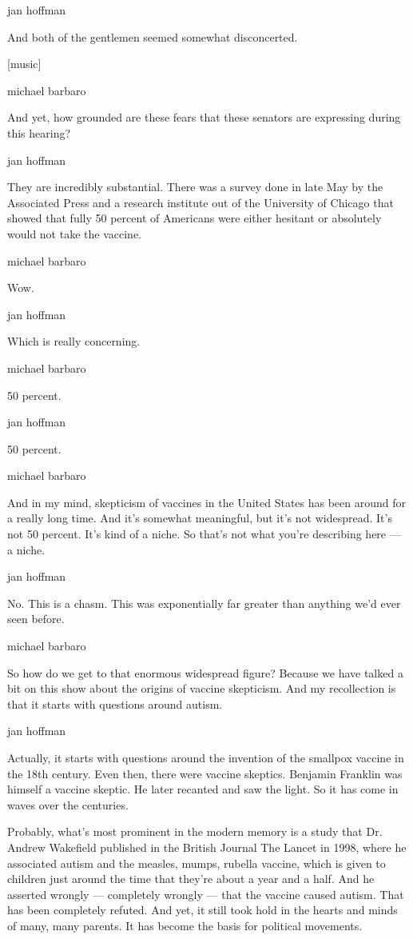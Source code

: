 jan hoffman

And both of the gentlemen seemed somewhat disconcerted.

{[}music{]}

michael barbaro

And yet, how grounded are these fears that these senators are expressing
during this hearing?

jan hoffman

They are incredibly substantial. There was a survey done in late May by
the Associated Press and a research institute out of the University of
Chicago that showed that fully 50 percent of Americans were either
hesitant or absolutely would not take the vaccine.

michael barbaro

Wow.

jan hoffman

Which is really concerning.

michael barbaro

50 percent.

jan hoffman

50 percent.

michael barbaro

And in my mind, skepticism of vaccines in the United States has been
around for a really long time. And it's somewhat meaningful, but it's
not widespread. It's not 50 percent. It's kind of a niche. So that's not
what you're describing here --- a niche.

jan hoffman

No. This is a chasm. This was exponentially far greater than anything
we'd ever seen before.

michael barbaro

So how do we get to that enormous widespread figure? Because we have
talked a bit on this show about the origins of vaccine skepticism. And
my recollection is that it starts with questions around autism.

jan hoffman

Actually, it starts with questions around the invention of the smallpox
vaccine in the 18th century. Even then, there were vaccine skeptics.
Benjamin Franklin was himself a vaccine skeptic. He later recanted and
saw the light. So it has come in waves over the centuries.

Probably, what's most prominent in the modern memory is a study that Dr.
Andrew Wakefield published in the British Journal The Lancet in 1998,
where he associated autism and the measles, mumps, rubella vaccine,
which is given to children just around the time that they're about a
year and a half. And he asserted wrongly --- completely wrongly --- that
the vaccine caused autism. That has been completely refuted. And yet, it
still took hold in the hearts and minds of many, many parents. It has
become the basis for political movements.

